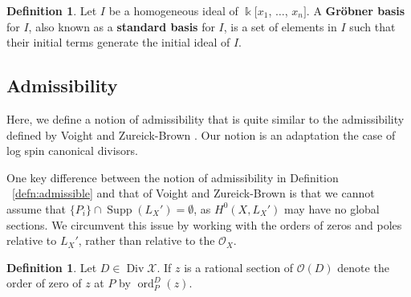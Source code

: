 \documentclass{amsart}
\theoremstyle{plain}
\theoremstyle{definition}
\newtheorem{defn}[thm]{Definition}
\theoremstyle{remark}
\numberwithin{equation}{section}
\newcommand\ssec{\subsection}
\newcommand\Bk{{\Bbbk}}
\newcommand\sco{{\mathscr O}}
\DeclareMathOperator{\ord}{ord}
\DeclareMathOperator\di{Div}
\newcommand\sx{\mathscr X}
\newcommand{\halfcan}{L}
\DeclareMathOperator{\Supp}{Supp}
\begin{document}

\begin{defn}
\label{defn:grobner-basis}
Let $I$ be a homogeneous ideal of $\Bk[x_{1}$, $\ldots$,
$x_{n}]$. A \textbf{Gr\"obner basis} for $I$, also known as a
\textbf{standard basis} for $I$, is a set of elements in $I$
such that their initial terms generate the initial
ideal of $I$.
\end{defn}

\ssec{Admissibility}

Here, we define a notion of admissibility that is quite similar to the admissibility defined by Voight and Zureick-Brown \cite[Definition 8.5.1]{vzb:stacky}. Our notion is an adaptation the case of log spin canonical divisors.

One key difference between the notion of admissibility in Definition ~\ref{defn:admissible} and that of Voight and Zureick-Brown \cite[Definition 8.5.1]{vzb:stacky} is that 
we cannot assume that $\{P_i\} \cap \Supp(L_X') = \emptyset$, as $H^0(X, \halfcan_X')$ may have no global sections. We circumvent this issue by working with the orders of zeros and poles relative to $\halfcan_X'$, rather than relative to the $\sco_X$.

\begin{defn}
\label{def:order-sup}
Let $D \in \di \sx.$ If $z$ is a rational section of $\sco(D)$ denote the order of
zero of $z$ at $P$ by $\ord_P^D(z)$.
\end{defn}
\end{document}

